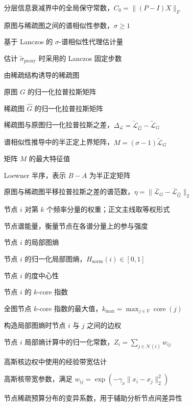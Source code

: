 \begin{denotation}[4.0cm]
  \item[$C_0$] 分层信息衰减界中的全局保守常数，$C_0=\|(P-I)X\|_F$
  \item[$\sigma$] 原图与稀疏图之间的谱相似性参数，$\sigma\ge 1$
  \item[$\widetilde{\sigma}_{\mathrm{proxy}}$] 基于 Lanczos 的 $\sigma$-谱相似性代理估计量
  \item[$K_{\mathrm{Lanczos}}$] 估计 $\widetilde{\sigma}_{\mathrm{proxy}}$ 时采用的 Lanczos 固定步数
  \item[$\hat{G}$] 由稀疏结构诱导的稀疏图
  \item[$\tilde{\mathcal{L}}_G$] 原图 $G$ 的归一化拉普拉斯矩阵
  \item[$\tilde{\mathcal{L}}_{\hat{G}}$] 稀疏图 $\hat{G}$ 的归一化拉普拉斯矩阵
  \item[$\Delta_{\mathcal{L}}$] 稀疏图与原图归一化拉普拉斯之差，$\Delta_{\mathcal{L}}=\tilde{\mathcal{L}}_{\hat{G}}-\tilde{\mathcal{L}}_G$
  \item[$M$] 谱相似性推导中的半正定上界矩阵，$M=(\sigma-1)\tilde{\mathcal{L}}_G$
  \item[$\lambda_{\max}(M)$] 矩阵 $M$ 的最大特征值
  \item[$A\preceq B$] Loewner 半序，表示 $B-A$ 为半正定矩阵
  \item[$\eta$] 原图与稀疏图平移拉普拉斯之差的谱范数，$\eta=\|\bar{\mathcal{L}}_G-\bar{\mathcal{L}}_{\hat{G}}\|_2$

  \item[$w_k(i)$] 节点 $i$ 对第 $k$ 个频率分量的权重；正文主线取等权形式
  \item[$E_{\mathrm{spectral}}(i)$] 节点谱能量，衡量节点在各谱分量上的参与强度
  \item[$H(i)$] 节点 $i$ 的局部图熵
  \item[$H_{\mathrm{norm}}(i)$] 节点 $i$ 的归一化局部图熵，$H_{\mathrm{norm}}(i)\in[0,1]$
  \item[$C_{\mathrm{deg}}(i)$] 节点 $i$ 的度中心性
  \item[$\operatorname{core}(i)$] 节点 $i$ 的 $k$-core 指数
  \item[$k_{\max}$] 全图节点 $k$-core 指数的最大值，$k_{\max}=\max_{j\in V}\operatorname{core}(j)$
  \item[$w_{ij}$] 构造局部图熵时节点 $i$ 与 $j$ 之间的边权
  \item[$Z_i$] 节点 $i$ 局部熵计算中的归一化常数，$Z_i=\sum_{j\in \mathcal{N}(i)}w_{ij}$
  \item[$\hat{\sigma}^2$] 高斯核边权中使用的经验带宽估计
  \item[$\gamma_x$] 高斯核带宽参数，满足 $w_{ij}=\exp(-\gamma_x\|x_i-x_j\|_2^2)$
  \item[$\mathrm{CV}(\{k_i\})$] 节点稀疏预算分布的变异系数，用于辅助分析节点间差异性


\end{denotation}
